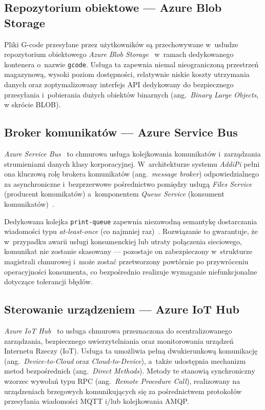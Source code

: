 \documentclass[a4paper,12pt,reqno]{article}
\begin{document}
\subsection{Repozytorium obiektowe --- Azure Blob Storage}

Pliki G-code przesyłane przez użytkowników są przechowywane w~usłudze repozytorium obiektowego \textit{Azure Blob Storage}~\cite{blobstorage} w~ramach dedykowanego kontenera o~nazwie \texttt{gcode}. Usługa ta zapewnia niemal nieograniczoną przestrzeń magazynową, wysoki poziom dostępności, relatywnie niskie koszty utrzymania danych oraz zoptymalizowany interfejs API dedykowany do bezpiecznego przesyłania i~pobierania dużych obiektów binarnych (ang.~\textit{Binary Large Objects}, w skrócie BLOB).

\subsection{Broker komunikatów --- Azure Service Bus}

\textit{Azure Service Bus}~\cite{servicebus} to chmurowa usługa kolejkowania komunikatów i~zarządzania strumieniami danych klasy korporacyjnej. W~architekturze systemu \textit{AddiPi} pełni ona kluczową rolę brokera komunikatów (ang.~\textit{message broker}) odpowiedzialnego za asynchroniczne i~bezprzerwowe pośrednictwo pomiędzy usługą \textit{Files Service} (producent komunikatów) a~komponentem \textit{Queue Service} (konsument komunikatów)~\cite{richardson2020}.

Dedykowana kolejka \texttt{print-queue} zapewnia niezawodną semantykę dostarczania wiadomości typu \textit{at-least-once} (co najmniej raz)~\cite{kleppmann2017}. Rozwiązanie to gwarantuje, że w~przypadku awarii usługi konsumenckiej lub utraty połączenia sieciowego, komunikat nie zostanie skasowany --- pozostaje on zabezpieczony w~strukturze magistrali chmurowej i~może zostać przetworzony powtórnie po przywróceniu operacyjności konsumenta, co bezpośrednio realizuje wymaganie niefunkcjonalne dotyczące tolerancji błędów.

\subsection{Sterowanie urządzeniem --- Azure IoT Hub}

\textit{Azure IoT Hub}~\cite{iothub} to usługa chmurowa przeznaczona do scentralizowanego zarządzania, bezpiecznego uwierzytelniania oraz monitorowania urządzeń Internetu Rzeczy (IoT). Usługa ta umożliwia pełną dwukierunkową komunikację (ang.~\textit{Device-to-Cloud} oraz \textit{\newline Cloud-to-Device}), a~także udostępnia mechanizm metod bezpośrednich (ang.~\textit{Direct Methods}). Metody te stanowią synchroniczny wzorzec wywołań typu RPC (ang.~\textit{Remote Procedure Call}), realizowany na urządzeniach brzegowych komunikujących się za pośrednictwem protokołów przesyłania wiadomości MQTT i/lub kolejkowania AMQP.
\end{document}
